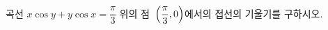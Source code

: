 곡선 $x\cos y+y\cos x=\dfrac{\pi}{3}$ 위의 점~$\left(\dfrac{\pi}{3}{,}\mkern3mu\mathopen{}0\right)$에서의 접선의 기울기를 구하시오.
